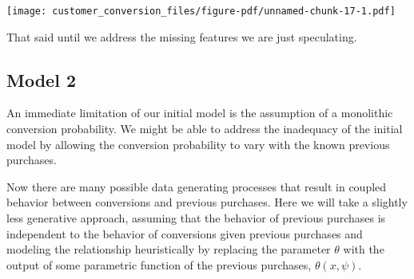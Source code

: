 \documentclass[
  letterpaper,
  DIV=11,
  numbers=noendperiod]{scrartcl}
\newenvironment{Shaded}{\begin{snugshade}}{\end{snugshade}}
\newcommand{\AttributeTok}[1]{\textcolor[rgb]{0.40,0.45,0.13}{#1}}
\newcommand{\DecValTok}[1]{\textcolor[rgb]{0.68,0.00,0.00}{#1}}
\newcommand{\FloatTok}[1]{\textcolor[rgb]{0.68,0.00,0.00}{#1}}
\newcommand{\FunctionTok}[1]{\textcolor[rgb]{0.28,0.35,0.67}{#1}}
\newcommand{\NormalTok}[1]{\textcolor[rgb]{0.00,0.23,0.31}{#1}}
\newcommand{\OtherTok}[1]{\textcolor[rgb]{0.00,0.23,0.31}{#1}}
\newcommand{\SpecialCharTok}[1]{\textcolor[rgb]{0.37,0.37,0.37}{#1}}
\newcommand{\StringTok}[1]{\textcolor[rgb]{0.13,0.47,0.30}{#1}}
\begin{document}
\begin{Shaded}
\end{Shaded}

\texttt{[image: customer\_conversion\_files/figure-pdf/unnamed-chunk-17-1.pdf]}

That said until we address the missing features we are just speculating.

\subsection{Model 2}\label{model-2}

An immediate limitation of our initial model is the assumption of a
monolithic conversion probability. We might be able to address the
inadequacy of the initial model by allowing the conversion probability
to vary with the known previous purchases.

Now there are many possible data generating processes that result in
coupled behavior between conversions and previous purchases. Here we
will take a slightly less generative approach, assuming that the
behavior of previous purchases is independent to the behavior of
conversions given previous purchases and modeling the relationship
heuristically by replacing the parameter \(\theta\) with the output of
some parametric function of the previous purchases, \(\theta(x, \psi)\).
\end{document}

